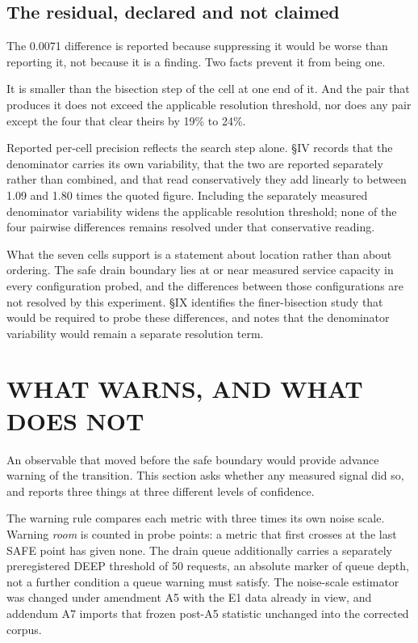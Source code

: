 \documentclass{ieeeaccess}
\begin{document}
\subsection{The residual, declared and not claimed}

The 0.0071 difference is reported because suppressing it would be worse than reporting it, not because it is a finding. Two facts prevent it from being one.

It is smaller than the bisection step of the cell at one end of it. And the pair that produces it does not exceed the applicable resolution threshold, nor does any pair except the four that clear theirs by 19\% to 24\%.

Reported per-cell precision reflects the search step alone. \S{}IV records that the denominator carries its own variability, that the two are reported separately rather than combined, and that read conservatively they add linearly to between 1.09 and 1.80 times the quoted figure. Including the separately measured denominator variability widens the applicable resolution threshold; none of the four pairwise differences remains resolved under that conservative reading.

What the seven cells support is a statement about location rather than about ordering. The safe drain boundary lies at or near measured service capacity in every configuration probed, and the differences between those configurations are not resolved by this experiment. \S{}IX identifies the finer-bisection study that would be required to probe these differences, and notes that the denominator variability would remain a separate resolution term.

\section{WHAT WARNS, AND WHAT DOES NOT}

An observable that moved before the safe boundary would provide advance warning of the transition. This section asks whether any measured signal did so, and reports three things at three different levels of confidence.

The warning rule compares each metric with three times its own noise scale. Warning \textit{room} is counted in probe points: a metric that first crosses at the last SAFE point has given none. The drain queue additionally carries a separately preregistered DEEP threshold of 50 requests, an absolute marker of queue depth, not a further condition a queue warning must satisfy. The noise-scale estimator was changed under amendment A5 with the E1 data already in view, and addendum A7 imports that frozen post-A5 statistic unchanged into the corrected corpus.
\end{document}
